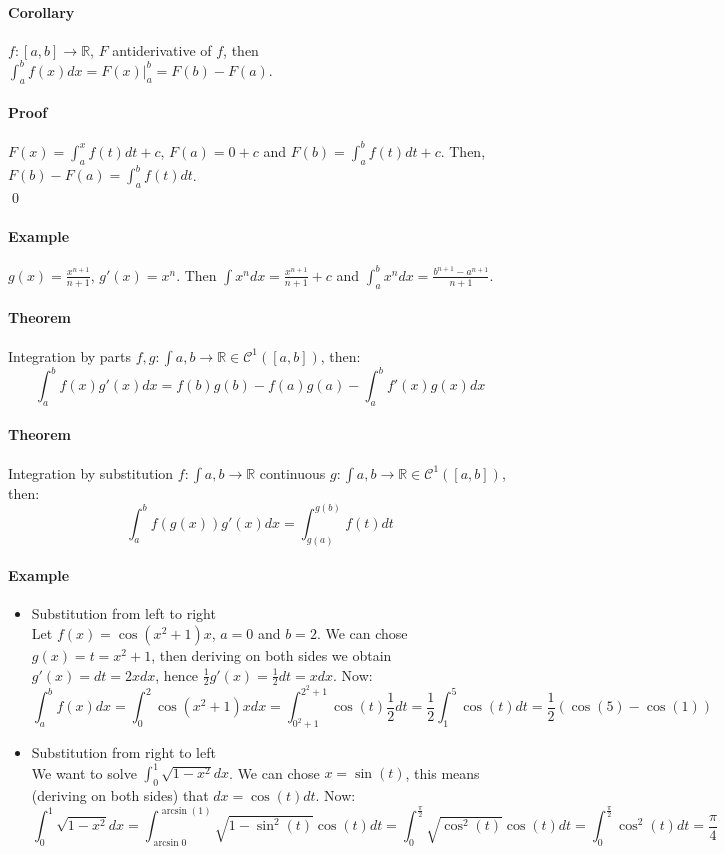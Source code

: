 \documentclass{article}
\newcommand{\functoR}[2]{#1 : #2 \rightarrow \mathbb{R}}
\newcommand{\intcc}[1]{\left[#1\right]}
\newcommand{\C}{\mathcal{C}}
\newcommand{\Theorem}{\paragraph{Theorem}}
\newcommand{\Corollary}{\paragraph{Corollary}}
\newcommand{\Proof}{\paragraph{Proof}}
\newcommand{\Example}{\paragraph{Example}}
\begin{document}
	\Corollary $\functoR{f}{\intcc{a,b}}$, $F$ antiderivative of $f$, then
	$\int_a^b f(x) dx = F(x) |_a^b = F(b) - F(a)$.

	\Proof $F(x) = \int_a^x f(t) dt + c$, $F(a) = 0 + c$ and $F(b) = \int_a^b
	f(t) dt + c$. Then, $F(b) - F(a) = \int_a^b f(t) dt$.
\\\qed

	\Example $g(x) = \frac{x^{n+1}}{n+1}$, $g'(x) = x^n$. Then $\int x^n dx =
	\frac{x^{n+1}}{n+1} + c$ and $\int_a^b x^n dx = \frac{b^{n+1} - a^{n+1}}{n+1}$.

	\Theorem Integration by parts
	$\functoR{f,g}{\int{a,b}} \in \C^1(\intcc{a,b})$, then:
	\begin{equation*}
		\int_a^b f(x) g'(x) dx = f(b)g(b) - f(a)g(a) - \int_a^b f'(x)g(x) dx
	\end{equation*}

	\Theorem Integration by substitution
	$\functoR{f}{\int{a,b}}$ continuous $\functoR{g}{\int{a,b}} \in
	\C^1(\intcc{a,b})$, then:
	\begin{equation*}
		\int_a^b f(g(x))g'(x) dx = \int_{g(a)}^{g(b)} f(t) dt
	\end{equation*}

	\Example
	\begin{itemize}
		\item Substitution from left to right
	\\Let $f(x) = \cos(x^2 + 1) x$, $a = 0$ and $b = 2$. We can chose $g(x) = t =
		x^2 + 1$, then deriving on both sides we obtain $g'(x) = dt = 2x dx$, hence
		$\frac{1}{2} g'(x) = \frac{1}{2} dt = x dx$. Now:
		\begin{equation*}
			\int_a^b f(x) dx =
			\int_0^2 \cos(x^2 + 1) x dx =
			\int_{0^2+1}^{2^2+1} \cos(t) \frac{1}{2} dt =
			\frac{1}{2} \int_1^5 \cos(t) dt =
			\frac{1}{2} \left(\cos(5) - \cos(1)\right)
		\end{equation*}

		\item Substitution from right to left
	\\We want to solve $\int_0^1 \sqrt{1-x^2}dx$. We can chose $x = \sin(t)$, this
		means (deriving on both sides) that $dx = \cos(t)dt$. Now:
		\begin{equation*}
			\int_0^1 \sqrt{1-x^2} dx =
			\int_{\arcsin{0}}^{\arcsin(1)} \sqrt{1-\sin^2(t)} \cos(t) dt =
			\int_0^{\frac{\pi}{2}} \sqrt{\cos^2(t)} \cos(t) dt =
			\int_0^{\frac{\pi}{2}} \cos^2(t) dt =
			\frac{\pi}{4}
		\end{equation*}
	\end{itemize}

\end{document}

